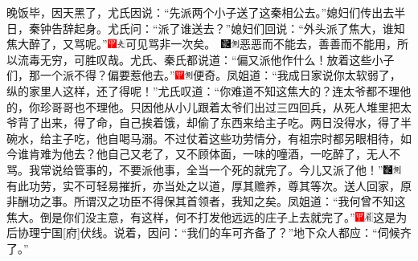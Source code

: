 晚饭毕，因天黑了，尤氏因说：“先派两个小子送了这秦相公去。”媳妇们传出去半日，秦钟告辞起身。尤氏问：“派了谁送去？”媳妇们回说：“外头派了焦大，谁知焦大醉了，又骂呢。”{{\includegraphics[width=3mm]{../Images/00002}\includegraphics[width=3mm]{../Images/00012}\footnotesize \kaishu 可见骂非一次矣。　}\includegraphics[width=3mm]{../Images/00006}\includegraphics[width=3mm]{../Images/00011}\footnotesize \kaishu 恶恶而不能去，善善而不能用，所以流毒无穷，可胜叹哉。}尤氏、秦氏都说道：“偏又派他作什么！放着这些小子们，那一个派不得？偏要惹他去。”{\includegraphics[width=3mm]{../Images/00002}\includegraphics[width=3mm]{../Images/00011}\footnotesize \kaishu 便奇。}凤姐道：“我成日家说你太软弱了，纵的家里人这样，还了得呢！”尤氏叹道：“你难道不知这焦大的？连太爷都不理他的，你珍哥哥也不理他。只因他从小儿跟着太爷们出过三四回兵，从死人堆里把太爷背了出来，得了命，自己挨着饿，却偷了东西来给主子吃。两日没得水，得了半碗水，给主子吃，他自喝马溺。不过仗着这些功劳情分，有祖宗时都另眼相待，如今谁肯难为他去？他自己又老了，又不顾体面，一味的噇酒，一吃醉了，无人不骂。我常说给管事的，不要派他事，全当一个死的就完了。今儿又派了他！”{\includegraphics[width=3mm]{../Images/00006}\includegraphics[width=3mm]{../Images/00011}\footnotesize \kaishu 有此功劳，实不可轻易摧折，亦当处之以道，厚其赡养，尊其等次。送人回家，原非酬功之事。所谓汉之功臣不得保其首领者，我知之矣。}凤姐道：“我何曾不知这焦大。倒是你们没主意，有这样，何不打发他远远的庄子上去就完了。”{\includegraphics[width=3mm]{../Images/00002}\includegraphics[width=3mm]{../Images/00010}\footnotesize \kaishu 这是为后协理宁国{[}府{]}伏线。}说着，因问：“我们的车可齐备了？”地下众人都应：“伺候齐了。”

